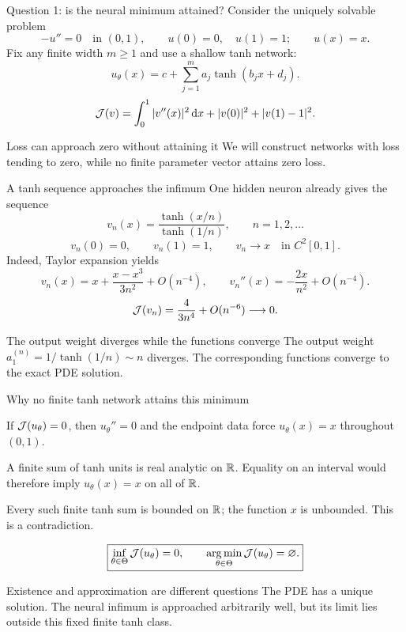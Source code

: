 
\renewcommand{\slideid}{L3-Q01}
\begin{frame}[c]{Question 1: is the neural minimum attained?}
\small
{}
Consider the uniquely solvable problem
\[
 -u''=0\quad\text{in }(0,1),\qquad u(0)=0,\quad u(1)=1;
 \qquad u(x)=x.
\]
Fix any finite width $m\ge1$ and use a shallow tanh network:
\[
 u_\theta(x)=c+\sum_{j=1}^{m}a_j\tanh(b_jx+d_j).
\]
\[
 \mathcal{J}(v)=\int_0^1|v''(x)|^2\,\mathrm d x
       +|v(0)|^2+|v(1)-1|^2.
\]
\begin{block}{Loss can approach zero without attaining it}
We will construct networks with loss tending to zero, while no finite
parameter vector attains zero loss.
\end{block}
\end{frame}

\renewcommand{\slideid}{L3-Q02}
\begin{frame}[c]{A tanh sequence approaches the infimum}
\small
One hidden neuron already gives the sequence
\[
 \boxed{v_n(x)=\frac{\tanh(x/n)}{\tanh(1/n)}},\qquad n=1,2,\ldots
\]
\[
 v_n(0)=0,\qquad v_n(1)=1,\qquad
 v_n\longrightarrow x\quad\text{in }C^2[0,1].
\]
Indeed, Taylor expansion yields
\[
 v_n(x)=x+\frac{x-x^3}{3n^2}+O(n^{-4}),\qquad
 v_n''(x)=-\frac{2x}{n^2}+O(n^{-4}).
\]
\[
 \mathcal{J}(v_n)=\frac{4}{3n^4}+O(n^{-6})\longrightarrow0.
\]
\begin{block}{The output weight diverges while the functions converge}
The output weight $a_1^{(n)}=1/\tanh(1/n)\sim n$ diverges.
The corresponding functions converge to the exact PDE solution.
\end{block}
\end{frame}

\renewcommand{\slideid}{L3-Q03}
\begin{frame}[c]{Why no finite tanh network attains this minimum}
\small
\begin{slideitems}
\item If $\mathcal{J}(u_\theta)=0$, then $u_\theta''=0$ and the endpoint data
force $u_\theta(x)=x$ throughout $(0,1)$.
\item A finite sum of tanh units is real analytic on $\mathbb{R}$.
Equality on an interval would therefore imply $u_\theta(x)=x$ on all of $\mathbb{R}$.
\item Every such finite tanh sum is bounded on $\mathbb{R}$; the function $x$ is
unbounded. This is a contradiction.
\end{slideitems}
\[
 \boxed{\inf_{\theta\in\Theta}\mathcal{J}(u_\theta)=0,
 \qquad \operatorname*{arg\,min}_{\theta\in\Theta}\mathcal{J}(u_\theta)=\varnothing.}
\]
\begin{block}{Existence and approximation are different questions}
The PDE has a unique solution. The neural infimum is approached arbitrarily
well, but its limit lies outside this fixed finite tanh class.
\end{block}
\end{frame}


